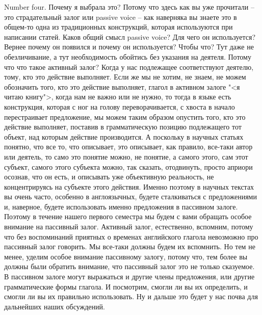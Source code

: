 \documentclass[main.tex]{subfiles}
\begin{document}
Number four. Почему я выбрала это? Потому что здесь как вы уже прочитали -- это страдательный залог или passive voice -- как наверняка вы знаете это в общем-то одна из традиционных конструкций, которая используются при написании статей.
Каков общий смысл passive voice?
Для чего он используется?
Вернее почему он появился и почему он используется?
Чтобы что?
Тут даже не обезличивание, а тут необходимость обойтись без указания на деятеля.
Потому что что такое активный залог? Когда у нас подлежащее соответствуют деятелю, тому, кто это действие выполняет.
Если же мы не хотим, не знаем, не можем обозначить того, кто это действие выполняет, глагол в активном залоге "<я читаю книгу">, когда нам не важно или не нужно, то тогда в языке есть конструкция, которая с ног на голову переворачивается, с хвоста в начало перестраивает предложение, мы можем таким образом опустить того, кто это действие выполняет, поставив в грамматическую позицию подлежащего тот объект, над которым действие производится.
А поскольку в научных статьях понятно, что все то, что описывает, это описывает, как правило, все-таки автор или деятель, то само это понятие можно, не понятие, а самого этого, сам этот субъект, самого этого субъекта можно, так сказать, отодвинуть, просто априори осознав, что он есть, и описывать уже объективную реальность, не концентрируясь на субъекте этого действия.
Именно поэтому в научных текстах вы очень часто, особенно в англоязычных, будете сталкиваться с предложениями и, наверное, будете использовать именно предложения в пассивном залоге.
Поэтому в течение нашего первого семестра мы будем с вами обращать особое внимание на пассивный залог.
Активный залог, естественно, вспомним, потому что без воспоминаний приятных о временах английского глагола невозможно про пассивный залог говорить.
Мы все-таки должны будем их вспомнить.
Но тем не менее, уделим особое внимание пассивному залогу, потому что, тем более вы должны были обратить внимание, что пассивный залог это не только сказуемое.
В пассивном залоге могут выражаться и другие члены предложения, или другие грамматические формы глагола.
И посмотрим, смогли ли вы их определить, и смогли ли вы их правильно использовать.
Ну и дальше это будет у нас почва для дальнейших наших обсуждений.
\end{document}
